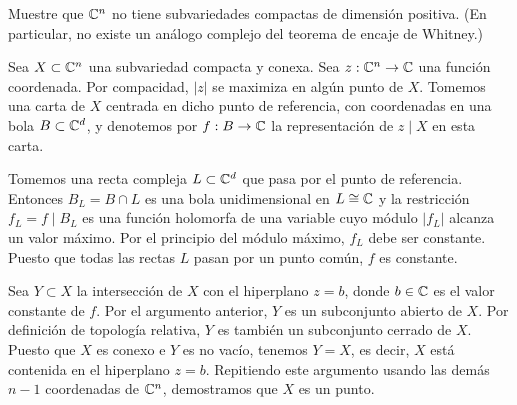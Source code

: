 \begin{exercise}
Muestre que $\mathbb C^n$ no tiene subvariedades compactas de dimensión positiva. (En particular, no existe un análogo complejo del teorema de encaje de Whitney.)
\end{exercise}

\begin{solution}
Sea $X \subset \mathbb C^n$ una subvariedad compacta y conexa. Sea $z : \mathbb C^n \to \mathbb C$ una función coordenada. Por compacidad, $|z|$ se maximiza en algún punto de $X$. Tomemos una carta de $X$ centrada en dicho punto de referencia, con coordenadas en una bola $B \subset \mathbb C^d$, y denotemos por $f : B \to \mathbb C$ la representación de $z \mid X$ en esta carta.

Tomemos una recta compleja $L \subset \mathbb C^d$ que pasa por el punto de referencia. Entonces $B_L = B \cap L$ es una bola unidimensional en $L \cong \mathbb C$ y la restricción $f_L = f \mid B_L$ es una función holomorfa de una variable cuyo módulo $|f_L|$ alcanza un valor máximo. Por el principio del módulo máximo, $f_L$ debe ser constante. Puesto que todas las rectas $L$ pasan por un punto común, $f$ es constante.

Sea $Y \subset X$ la intersección de $X$ con el hiperplano $z = b$, donde $b \in \mathbb C$ es el valor constante de $f$. Por el argumento anterior, $Y$ es un subconjunto abierto de $X$. Por definición de topología relativa, $Y$ es también un subconjunto cerrado de $X$. Puesto que $X$ es conexo e $Y$ es no vacío, tenemos $Y = X$, es decir, $X$ está contenida en el hiperplano $z = b$. Repitiendo este argumento usando las demás $n-1$ coordenadas de $\mathbb C^n$, demostramos que $X$ es un punto.
\end{solution}

